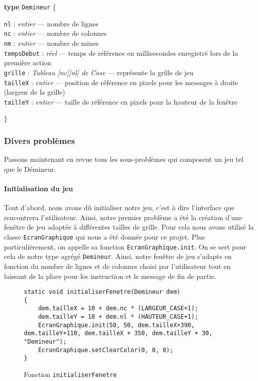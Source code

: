 \documentclass[a4paper, 12pt, oneside]{article}
\newenvironment{typeag}[1][]{\noindent \textbf{type} \texttt{#1} \{\begin{addmargin}[2em]{0em}}{\end{addmargin}\}}
\newcommand{\variable}[3]{\noindent \texttt{#1} : \textit{#2} --- #3}
\newcommand{\var}[1]{\texttt{#1}}
\begin{document}
\begin{typeag}[Demineur]
	\variable{nl}{entier}{nombre de lignes} \\
	\variable{nc}{entier}{nombre de colonnes} \\
	\variable{nm}{entier}{nombre de mines} \\
	\variable{tempsDebut}{réel}{temps de référence en millisecondes enregistré lors de la première action} \\
	\variable{grille}{Tableau [nc][nl] de Case}{représente la grille de jeu} \\
	\variable{tailleX}{entier}{position de référence en pixels pour les messages à droite (largeur de la grille)} \\
	\variable{tailleY}{entier}{taille de référence en pixels pour la hauteur de la fenêtre}
\end{typeag}\smallskip

\subsubsection{Divers problèmes}
Passons maintenant en revue tous les sous-problèmes qui composent un jeu tel que le Démineur.

\paragraph{Initialisation du jeu} Tout d'abord, nous avons dû initialiser notre jeu, c'est à dire l'interface que rencontrera l'utilisateur. Ainsi, notre premier problème a été la création d'une fenêtre de jeu adaptée à différentes tailles de grille. Pour cela nous avons utilisé la classe \var{EcranGraphique} qui nous a été donnée pour ce projet. Plus particulièrement, on appelle sa fonction \var{EcranGraphique.init}. On se sert pour cela de notre type agrégé \var{Demineur}. Ainsi, notre fenêtre de jeu s'adapte en fonction du nombre de lignes et de colonnes choisi par l'utilisateur tout en laissant de la place pour les instruction et le message de fin de partie.

\begin{figure}[hpt]
	\center
	\caption{\label{fig:fnInitialiserFenetre} Fonction \var{initialiserFenetre}}
\begin{lstlisting}
static void initialiserFenetre(Demineur dem)
{
	dem.tailleX = 10 + dem.nc * (LARGEUR_CASE+1);
	dem.tailleY = 10 + dem.nl * (HAUTEUR_CASE+1);
	EcranGraphique.init(50, 50, dem.tailleX+390, dem.tailleY+110, dem.tailleX + 350, dem.tailleY + 30, "Demineur");
	EcranGraphique.setClearColor(0, 0, 0);
}
\end{lstlisting}
\end{figure} 
\end{document}
